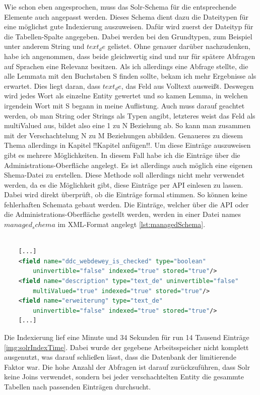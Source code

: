 Wie schon eben angesprochen, muss das Solr-Schema für die entsprechende Elemente auch angepasst werden. Dieses Schema dient dazu die Dateitypen für eine möglichst gute Indexierung auszuweisen. Dafür wird zuerst der Dateityp für die Tabellen-Spalte angegeben. Dabei werden bei den Grundtypen, zum Beispiel unter anderem String und $text_de$ gelistet. Ohne genauer darüber nachzudenken, habe ich angenommen, dass beide gleichwertig sind und nur für spätere Abfragen auf Sprachen eine Relevanz besitzen. Als ich allerdings eine Abfrage stellte, die alle Lemmata mit den Buchstaben S finden sollte, bekam ich mehr Ergebnisse als erwartet. Dies liegt daran, dass $text_de$, das Feld aus Volltext ausweißt. Deswegen wird jedes Wort als einzelne Entity gewertet und so kamen Lemma, in welchen irgendein Wort mit S begann in meine Auflistung. Auch muss darauf geachtet werden, ob man String oder Strings als Typen angibt, letzteres weist das Feld als multiValued aus, bildet also eine 1 zu N Beziehung ab. So kann man zusammen mit der Verschachtelung N zu M Beziehungen abbilden. Genaueres zu diesem Thema allerdings in Kapitel !!Kapitel anfügen!!.
Um diese Einträge auszuweisen gibt es mehrere Möglichkeiten. In diesem Fall habe ich die Einträge über die Administrations-Oberfläche angelegt. Es ist allerdings auch möglich eine eigenen Shema-Datei zu erstellen. Diese Methode soll allerdings nicht mehr verwendet werden, da es die Möglichkeit gibt, diese Einträge per API einlesen zu lassen. Dabei wird direkt überprüft, ob die Einträge formal stimmen. So können keine fehlerhaften Schemata gebaut werden. Die Einträge, welcher über die API oder die Administrations-Oberfläche gestellt werden, werden in einer Datei names $managed_schema$ im XML-Format angelegt \ref{lst:managedSchema}.


\begin{lstlisting}[language=xml, frame=single, label={lst:managedSchema}, 
    morekeywords={type,uninvertible,indexed,stored,field,multiValued, name}] 

    [...]
    <field name="ddc_webdewey_is_checked" type="boolean" 
        uninvertible="false" indexed="true" stored="true"/>
    <field name="description" type="text_de" uninvertible="false" 
        multiValued="true" indexed="true" stored="true"/>
    <field name="erweiterung" type="text_de" 
        uninvertible="false" indexed="true" stored="true"/>
    [...]

\end{lstlisting}

Die Indexierung lief eine Minute und 34 Sekunden für run 14 Tausend Einträge \ref{img:solrIndexTime}. Dabei wurde der gegebene Arbeitsspeicher nicht komplett ausgenutzt, was darauf schließen lässt, dass die Datenbank der limitierende Faktor war. Die hohe Anzahl der Abfragen ist darauf zurückzuführen, dass Solr keine Joins verwendet, sondern bei jeder verschachtelten Entity die gesammte Tabellen nach passenden Einträgen durchsucht.


